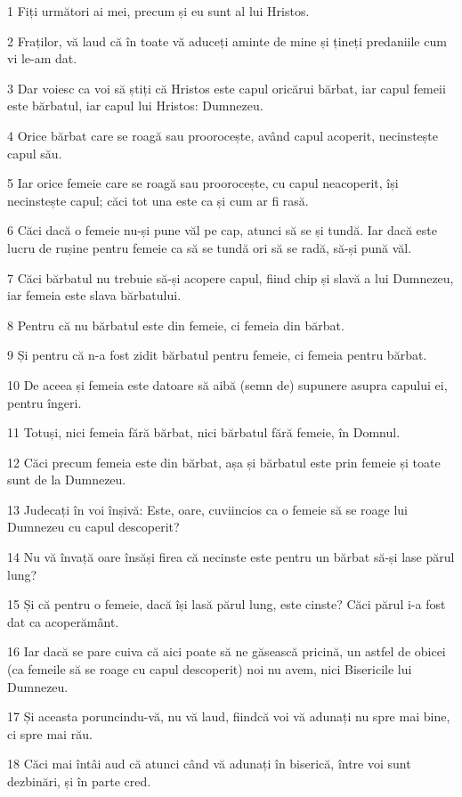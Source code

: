 \par 1 Fiți următori ai mei, precum și eu sunt al lui Hristos.
\par 2 Fraților, vă laud că în toate vă aduceți aminte de mine și țineți predaniile cum vi le-am dat.
\par 3 Dar voiesc ca voi să știți că Hristos este capul oricărui bărbat, iar capul femeii este bărbatul, iar capul lui Hristos: Dumnezeu.
\par 4 Orice bărbat care se roagă sau proorocește, având capul acoperit, necinstește capul său.
\par 5 Iar orice femeie care se roagă sau proorocește, cu capul neacoperit, își necinstește capul; căci tot una este ca și cum ar fi rasă.
\par 6 Căci dacă o femeie nu-și pune văl pe cap, atunci să se și tundă. Iar dacă este lucru de rușine pentru femeie ca să se tundă ori să se radă, să-și pună văl.
\par 7 Căci bărbatul nu trebuie să-și acopere capul, fiind chip și slavă a lui Dumnezeu, iar femeia este slava bărbatului.
\par 8 Pentru că nu bărbatul este din femeie, ci femeia din bărbat.
\par 9 Și pentru că n-a fost zidit bărbatul pentru femeie, ci femeia pentru bărbat.
\par 10 De aceea și femeia este datoare să aibă (semn de) supunere asupra capului ei, pentru îngeri.
\par 11 Totuși, nici femeia fără bărbat, nici bărbatul fără femeie, în Domnul.
\par 12 Căci precum femeia este din bărbat, așa și bărbatul este prin femeie și toate sunt de la Dumnezeu.
\par 13 Judecați în voi înșivă: Este, oare, cuviincios ca o femeie să se roage lui Dumnezeu cu capul descoperit?
\par 14 Nu vă învață oare însăși firea că necinste este pentru un bărbat să-și lase părul lung?
\par 15 Și că pentru o femeie, dacă își lasă părul lung, este cinste? Căci părul i-a fost dat ca acoperământ.
\par 16 Iar dacă se pare cuiva că aici poate să ne găsească pricină, un astfel de obicei (ca femeile să se roage cu capul descoperit) noi nu avem, nici Bisericile lui Dumnezeu.
\par 17 Și aceasta poruncindu-vă, nu vă laud, fiindcă voi vă adunați nu spre mai bine, ci spre mai rău.
\par 18 Căci mai întâi aud că atunci când vă adunați în biserică, între voi sunt dezbinări, și în parte cred.
